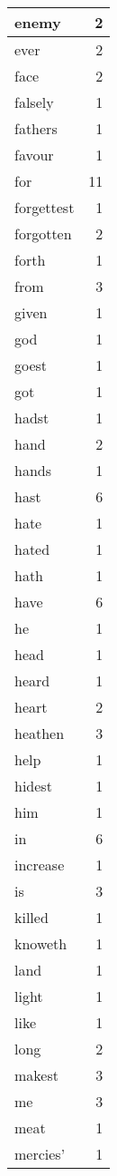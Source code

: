 \begin{center}
\begin{longtable}{l|r}
enemy & 2 \\ \hline
ever & 2 \\ \hline
face & 2 \\ \hline
falsely & 1 \\ \hline
fathers & 1 \\ \hline
favour & 1 \\ \hline
for & 11 \\ \hline
forgettest & 1 \\ \hline
forgotten & 2 \\ \hline
forth & 1 \\ \hline
from & 3 \\ \hline
given & 1 \\ \hline
god & 1 \\ \hline
goest & 1 \\ \hline
got & 1 \\ \hline
hadst & 1 \\ \hline
hand & 2 \\ \hline
hands & 1 \\ \hline
hast & 6 \\ \hline
hate & 1 \\ \hline
hated & 1 \\ \hline
hath & 1 \\ \hline
have & 6 \\ \hline
he & 1 \\ \hline
head & 1 \\ \hline
heard & 1 \\ \hline
heart & 2 \\ \hline
heathen & 3 \\ \hline
help & 1 \\ \hline
hidest & 1 \\ \hline
him & 1 \\ \hline
in & 6 \\ \hline
increase & 1 \\ \hline
is & 3 \\ \hline
killed & 1 \\ \hline
knoweth & 1 \\ \hline
land & 1 \\ \hline
light & 1 \\ \hline
like & 1 \\ \hline
long & 2 \\ \hline
makest & 3 \\ \hline
me & 3 \\ \hline
meat & 1 \\ \hline
mercies' & 1 \\ \hline

\end{longtable}
\end{center}
